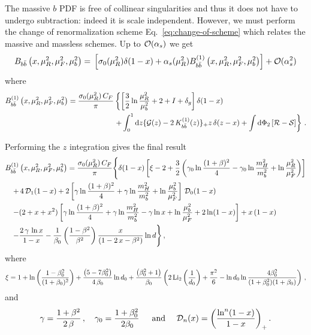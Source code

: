 The massive $b$ PDF is free of collinear singularities and thus it
does
not have to
undergo subtraction: indeed it is scale independent.
However, we must perform the change of
renormalization scheme Eq.~\eqref{eq:change-of-scheme} which relates
the massive and massless schemes.
Up to ${\cal O}(\alpha_s)$ we get
\begin{equation}
  B_{b\bar{b}}\left(x,\mu_R^2,\mu_F^2 ,\mu_b^2\right) =
  \,\left[ \sigma_0(\mu_R^2) \delta(1-x) + \alpha_s(\mu_R^2)
    B_{b\bar{b}}^{(1)}\left(x,\mu_R^2,\mu_F^2 ,\mu_b^2\right) \right]
  +{\cal O}(\alpha_s^2)
\end{equation}
where
\begin{equation}
  \begin{split}
  B_{b\bar{b}}^{(1)}\left(x,\mu_R^2,\mu_F^2 ,\mu_b^2\right) =
  \frac{\sigma_0(\mu_R^2)\,C_F}{\pi}&
  \left\{
    \left[
      \frac{3}{2}\ln\frac{\mu_R^2}{\mu_b^2}+2 + I + \delta_g
    \right]\delta(1-x) \right.\\
  &\left.
   + \int_0^1{\rm d}z \{{\cal G}(z) - 2\,K_{b\bar{b}}^{(1)}(z)\}_+z\,\delta(z-x)
   +  \int{\rm d}\Phi_2 \left[{\cal R} -{\cal S}\right] \right\}\,.
  \end{split}
\end{equation}

Performing the $z$ integration gives the final result
\begin{equation}
  \label{eq:b1-massive}
  \begin{split}
    B_{b\bar{b}}^{(1)}&\left(x,\mu_R^2,\mu_F^2 ,\mu_b^2\right) =
    \frac{\sigma_0(\mu_R^2)\,C_F}{\pi}
    \Biggl\{
    \delta(1-x)
    \left[
      \xi -2 + \frac{3}{2}\left(\gamma_0\ln
        \frac{(1+\beta)^2}{4} -\gamma_0\ln \frac{m_H^2}{m_b^2}+
        \ln\frac{\mu_R^2}{\mu_F^2} \right)
    \right]\\
  +&\,4\,{\cal D}_1(1-x) 
  +  2
  \left[
    \gamma\ln\frac{(1+\beta)^2}{4}+\gamma\ln\frac{m_H^2}{m_b^2}+
    \ln{\frac{\mu_b^2}{\mu_F^2}}
  \right]\,
  {\cal D}_0(1-x)\\
  -& (2 + x + x^2)\left[\gamma\ln\frac{(1+\beta)^2}{4}
    +\gamma\ln\frac{m_H^2}{m_b^2}-\gamma\ln x+
    \ln{\frac{\mu_b^2}{\mu_F^2}}
    +2\ln(1-x)\right]+ x\,(1-x) \\
  -&  \frac{2\,\gamma\,\ln x}{1-x} -
    \frac{1}{\beta_0}\left(\frac{ 1-\beta^2}{\beta^2}\right)
    \frac{x}{\left( 1 - 2\,x - \beta^2\right)}\ln d \Biggr\}\,,
  \end{split} 
\end{equation}
where
\begin{equation}
  \xi = 1+\ln\left(\frac{1-\beta_0^2}{(1+\beta_0)^2}\right)+
  \frac{\left(5-7\beta_0^2\right)}{4\,\beta_0}\ln d_0+
  \frac{\left(\beta_0^2+1\right)}{\beta_0} \left( 2\,{\rm
      Li}_2\left(\frac{1}{d_0}\right)+\frac{\pi ^2}{6} -\ln d_0
    \ln\frac{4\beta_0^2} {(1+\beta_0^2)(1+\beta_0)}\right)\,,
\end{equation}
and
\begin{equation}
  \gamma = \frac{1+\beta^2}{2\,\beta}\,,\quad \gamma_0 =
  \frac{1+\beta_0^2}{\,2\beta_0}\, \quad \text{ and }
  \quad {\cal D}_n(x) ={\left( \frac{\ln^n(1-x)}{1-x} \right) }_{+}\,.
\end{equation}

